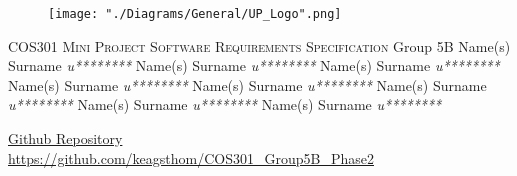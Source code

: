 \begin{titlepage}
\begin{center}
\begin{figure}[t]
\centering
\texttt{[image: "./Diagrams/General/UP\_Logo".png]}
\end{figure}
\begin{flushright}
\textsc{\LARGE COS301 Mini Project \newline\newline Software Requirements \newline   Specification}
\newline\newline \Large Group 5B \newline\newline
\large
Name(s) Surname    \emph{u********} \newline
Name(s) Surname    \emph{u********} \newline
Name(s) Surname    \emph{u********} \newline
Name(s) Surname    \emph{u********} \newline
Name(s) Surname    \emph{u********} \newline
Name(s) Surname    \emph{u********} \newline
Name(s) Surname    \emph{u********} \newline
Name(s) Surname    \emph{u********} \newline
\end{flushright}
\vfill
\href{https://github.com/keagsthom/COS301_Group5B_Phase2}{Github Repository}\\
\url{https://github.com/keagsthom/COS301_Group5B_Phase2}
\end{center}
\end{titlepage}